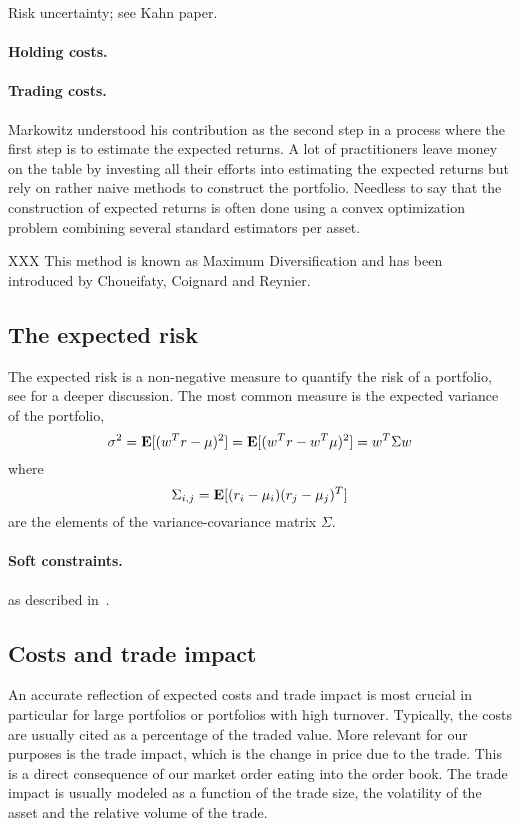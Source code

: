 \documentclass[12pt]{article}
\begin{document}
Risk uncertainty; see Kahn paper.

\paragraph{Holding costs.}

\paragraph{Trading costs.}

\clearpage
Markowitz \cite{markowitz1952portfolio} understood his contribution as the second step in a process
where the first step is to estimate the expected returns.
A lot of practitioners leave money on the table by investing all their efforts into estimating
the expected returns but rely on rather naive methods to construct the portfolio.
Needless to say that the construction of expected returns is often done using
a convex optimization problem combining several standard estimators per asset.

XXX This method is known as Maximum Diversification and has been introduced
by Choueifaty, Coignard and Reynier\cite{choueifaty2011toward}.

\subsection{The expected risk}

The expected risk is a non-negative measure to quantify the risk of a portfolio,
see \cite{delbaen2002coherent} for a deeper discussion.
The most common measure is the expected variance of the portfolio, \eg
\[
\sigma^2 = \mathop{\bf E{}}[(w^T r - \mu)^2] = \mathop{\bf E{}}[(w^T r - w^T \mu)^2] = w^T \Sigma w
\]
where
\[
    \Sigma_{i,j} = \mathop{\bf E{}}[(r_i - \mu_i)(r_j - \mu_j)^T]
\]
are the elements of the variance-covariance matrix $\Sigma$.

\paragraph{Soft constraints.}
as described in~\cite[\S4.2]{BoydKahnMultiPeriod}.


\subsection{Costs and trade impact}

An accurate reflection of expected costs and trade impact is most crucial in particular
for large portfolios or portfolios with high turnover. Typically, the costs are
usually cited as a percentage of the traded value. More relevant for our purposes
is the trade impact, which is the change in price due to the trade. This is a direct
consequence of our market order eating into the order book. The trade impact is
usually modeled as a function of the trade size, the volatility of the asset and
the relative volume of the trade.
\end{document}
